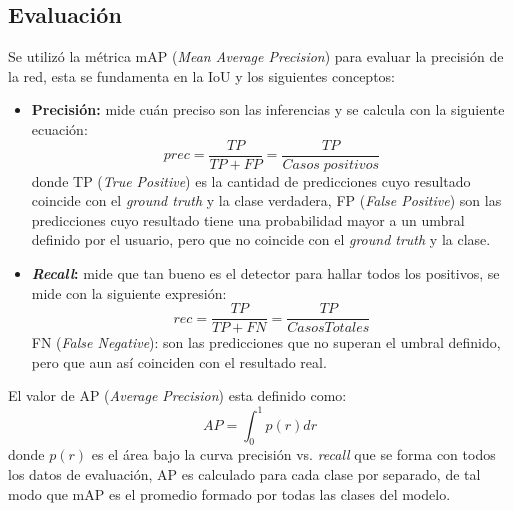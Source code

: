 \subsection{Evaluación}
Se utilizó la métrica mAP (\textit{Mean Average Precision}) para evaluar la precisión de la red, esta se fundamenta en la IoU y los siguientes conceptos:
\begin{itemize}
    \item \textbf{Precisión:} mide cuán preciso son las inferencias y se calcula con la siguiente ecuación:
    \begin{equation}
        prec = \frac{TP}{TP + FP} = \frac{TP}{Casos\; positivos}
    \end{equation}
    donde TP (\textit{True Positive}) es la cantidad de predicciones cuyo resultado coincide con el \textit{ground truth} y la clase verdadera, FP (\textit{False Positive}) son las predicciones cuyo resultado tiene una probabilidad mayor a un umbral definido por el usuario, pero que no coincide con el \textit{ground truth} y la clase.
    \item \textbf{\textit{Recall}:} mide que tan bueno es el detector para hallar todos los positivos, se mide con la siguiente expresión:
    \begin{equation}
        rec = \frac{TP}{TP + FN} = \frac{TP}{Casos Totales}
    \end{equation}
    FN (\textit{False Negative}): son las predicciones que no superan el umbral definido, pero que aun así coinciden con el resultado real.
\end{itemize}
El valor de AP (\textit{Average Precision}) esta definido como:
\begin{equation}
    AP = \int_{0}^{1} p(r)dr
\end{equation}
donde $p(r)$ es el área bajo la curva precisión vs. \textit{recall} que se forma con todos los datos de evaluación, AP es calculado para cada clase por separado, de tal modo que mAP es el promedio formado por todas las clases del modelo. 
